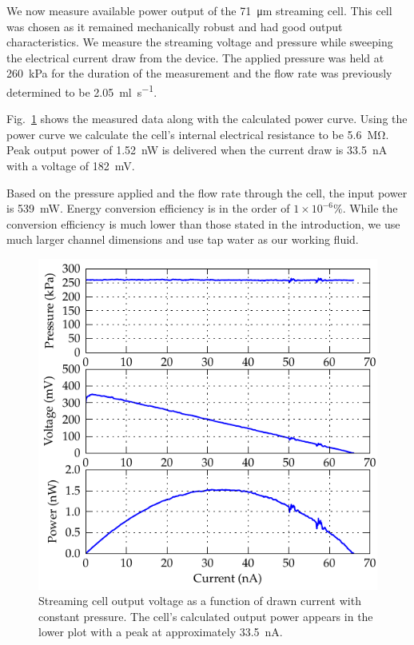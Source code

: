 \documentclass[10pt,final,journal]{IEEEtran}
\begin{document}
    We now measure available power output of the \SI{71}{\micro\meter} streaming cell.
    This cell was chosen as it remained mechanically robust and had good output characteristics.
    We measure the streaming voltage and pressure while sweeping the electrical current draw from the device.
    The applied pressure was held at \SI{260}{\kilo\pascal} for the duration of the measurement and the flow rate was previously determined to be \SI{2.05}{\milli\litre\per\second}.

    Fig.~\ref{fig:cellOutput} shows the measured data along with the calculated power curve.
    Using the power curve we calculate the cell's internal electrical resistance to be \SI{5.6}{\mega\ohm}.
    Peak output power of \SI{1.52}{\nano\watt} is delivered when the current draw is \SI{33.5}{\nano\ampere} with a voltage of \SI{182}{\milli\volt}.

    Based on the pressure applied and the flow rate through the cell, the input power is \SI{539}{\milli\watt}.
    Energy conversion efficiency is in the order of $1\times 10^{-6}\%$.
    While the conversion efficiency is much lower than those stated in the introduction, we use much larger channel dimensions and use tap water as our working fluid.

    \begin{figure}
        \begin{center}
        \includegraphics[width=\linewidth]{graph_cellOutput}
        \end{center}
        \caption{Streaming cell output voltage as a function of drawn current with constant pressure.
        The cell's calculated output power appears in the lower plot with a peak at approximately \SI{33.5}{\nano\ampere}.}
        \label{fig:cellOutput}
    \end{figure}
\end{document}
